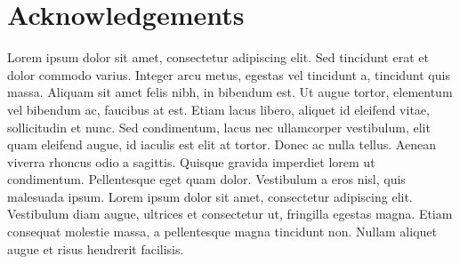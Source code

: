 \documentclass[letterpaper, 10 pt, conference]{ieeeconf}
\begin{document}
\section{Acknowledgements}
Lorem ipsum dolor sit amet, consectetur adipiscing elit. Sed tincidunt erat et dolor commodo varius. Integer arcu metus, egestas vel tincidunt a, tincidunt quis massa. Aliquam sit amet felis nibh, in bibendum est. Ut augue tortor, elementum vel bibendum ac, faucibus at est. Etiam lacus libero, aliquet id eleifend vitae, sollicitudin et nunc. Sed condimentum, lacus nec ullamcorper vestibulum, elit quam eleifend augue, id iaculis est elit at tortor. Donec ac nulla tellus. Aenean viverra rhoncus odio a sagittis. Quisque gravida imperdiet lorem ut condimentum. Pellentesque eget quam dolor. Vestibulum a eros nisl, quis malesuada ipsum. Lorem ipsum dolor sit amet, consectetur adipiscing elit. Vestibulum diam augue, ultrices et consectetur ut, fringilla egestas magna. Etiam consequat molestie massa, a pellentesque magna tincidunt non. Nullam aliquet augue et risus hendrerit facilisis.


%
\end{document}
